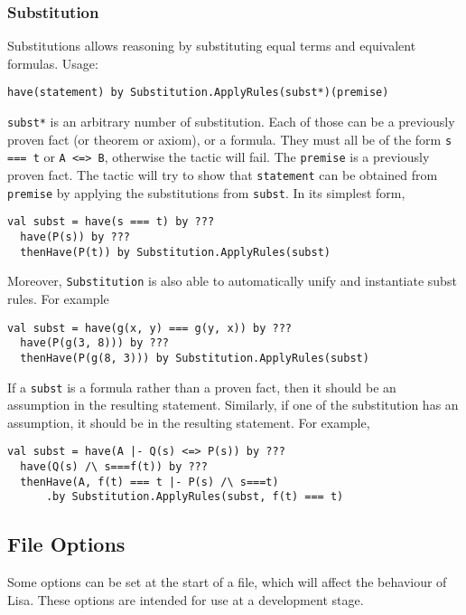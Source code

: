 \subsubsection*{Substitution}
Substitutions allows reasoning by substituting equal terms and equivalent formulas. Usage:
\begin{lstlisting}[language=lisa]
  have(statement) by Substitution.ApplyRules(subst*)(premise)
\end{lstlisting}

\lstinline|subst*| is an arbitrary number of substitution. Each of those can be a previously proven fact (or theorem or axiom), or a formula. They must all be of the form \lstinline|s === t| or \lstinline|A <=> B|, otherwise the tactic will fail. The \lstinline|premise| is a previously proven fact. The tactic will try to show that \lstinline|statement| can be obtained from \lstinline|premise| by applying the substitutions from \lstinline|subst|. In its simplest form,
\begin{lstlisting}[language=lisa]
  val subst = have(s === t) by ???
  have(P(s)) by ???
  thenHave(P(t)) by Substitution.ApplyRules(subst)
\end{lstlisting}

Moreover, \lstinline|Substitution| is also able to  automatically unify and instantiate subst rules. For example

\begin{lstlisting}[language=lisa]
  val subst = have(g(x, y) === g(y, x)) by ???
  have(P(g(3, 8))) by ???
  thenHave(P(g(8, 3))) by Substitution.ApplyRules(subst)
\end{lstlisting}

If a \lstinline|subst| is a formula rather than a proven fact, then it should be an assumption in the resulting statement. Similarly, if one of the substitution has an assumption, it should be in the resulting statement. For example,

\begin{lstlisting}[language=lisa]
  val subst = have(A |- Q(s) <=> P(s)) by ???
  have(Q(s) /\ s===f(t)) by ???
  thenHave(A, f(t) === t |- P(s) /\ s===t) 
      .by Substitution.ApplyRules(subst, f(t) === t)
\end{lstlisting}


\subsection*{File Options}
Some options can be set at the start of a file, which will affect the behaviour of Lisa. These options are intended for use at a development stage.


